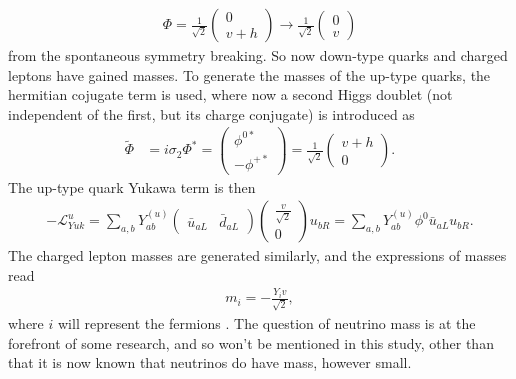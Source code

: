 \documentclass[a4paper,12pt]{article}
\begin{document}
\begin{align}
    \label{eq:vtoh}
    \Phi = \frac{1}{\sqrt{2}}\begin{pmatrix}0\\v+h\end{pmatrix}\to\frac{1}{\sqrt{2}}\begin{pmatrix}0\\v\end{pmatrix}
\end{align}
from the spontaneous symmetry breaking. 
So now down-type quarks and charged leptons have gained masses. 
To generate the masses of the up-type quarks, the hermitian cojugate term is used, where now a second Higgs doublet (not independent of the first, but its charge conjugate) is introduced as
\begin{align}
    \label{eq:highc}
    \tilde{\Phi} &= i\sigma_2\Phi^* = \begin{pmatrix}\phi^{0*}\\-\phi^{+*}\end{pmatrix} = \frac{1}{\sqrt{2}}\begin{pmatrix}v+h\\0\end{pmatrix}.
\end{align}
The up-type quark Yukawa term is then
\begin{align}
    \label{eq:yukhc}
    -\mathcal{L}_{Yuk}^u = \sum_{a,b} Y^{(u)}_{ab}\begin{pmatrix}\bar{u}_{aL} & \bar{d}_{aL}\end{pmatrix}\begin{pmatrix}\frac{v}{\sqrt{2}}\\0\end{pmatrix}u_{bR} = \sum_{a,b}Y^{(u)}_{ab}\phi^0\bar{u}_{aL}u_{bR}.
\end{align}
The charged lepton masses are generated similarly, and the expressions of masses read
\begin{align}
    \label{eq:fermas}
    m_i = -\frac{Y_iv}{\sqrt{2}},
\end{align}
where $i$ will represent the fermions \cite{schwartz}. 
The question of neutrino mass is at the forefront of some research, and so won't be mentioned in this study, other than that it is now known that neutrinos do have mass, however small. 
\end{document}
